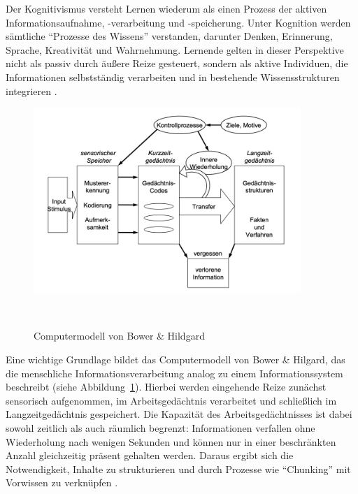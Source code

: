 Der Kognitivismus versteht Lernen wiederum als einen Prozess der aktiven Informationsaufnahme, -verarbeitung und -speicherung. Unter Kognition werden sämtliche \enquote{Prozesse des Wissens} verstanden, darunter Denken, Erinnerung, Sprache, Kreativität und Wahrnehmung. Lernende gelten in dieser Perspektive nicht als passiv durch äußere Reize gesteuert, sondern als aktive Individuen, die Informationen selbstständig verarbeiten und in bestehende Wissensstrukturen integrieren \parencite[S.~1]{furstenau_lehr-lern-theorien_2019}.

\begin{figure}[htbp]
    \centering
    \includegraphics[width=0.90\textwidth]{img/Computermodell.png}
    \caption{Computermodell von Bower \& Hildgard}~\parencite[S.~234]{bower_theorie_1984}
    \label{fig:computermodell}
\end{figure}

Eine wichtige Grundlage bildet das Computermodell von Bower \& Hilgard, das die menschliche Informationsverarbeitung analog zu einem Informationssystem beschreibt (siehe Abbildung~\ref{fig:computermodell}). Hierbei werden eingehende Reize zunächst sensorisch aufgenommen, im Arbeitsgedächtnis verarbeitet und schließlich im Langzeitgedächtnis gespeichert. Die Kapazität des Arbeitsgedächtnisses ist dabei sowohl zeitlich als auch räumlich begrenzt: Informationen verfallen ohne Wiederholung nach wenigen Sekunden und können nur in einer beschränkten Anzahl gleichzeitig präsent gehalten werden. Daraus ergibt sich die Notwendigkeit, Inhalte zu strukturieren und durch Prozesse wie \enquote{Chunking} mit Vorwissen zu verknüpfen \parencite[S.~15]{pfeiffer_simulationsumgebungen_2008}.

